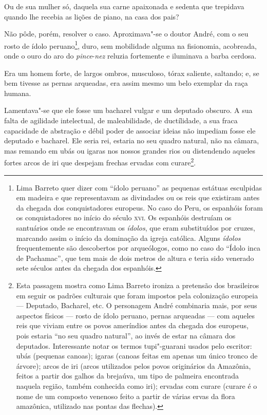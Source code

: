Ou de sua mulher só, daquela sua carne apaixonada e sedenta que
trepidava quando lhe recebia as lições de piano, na casa dos pais?

Não pôde, porém, resolver o caso. Aproximava"-se o doutor André, com o
seu rosto de ídolo peruano\footnote{Lima Barreto quer dizer com ``ídolo
  peruano'' as pequenas estátuas esculpidas em madeira e que
  representavam as divindades ou os reis que existiram antes da chegada
  dos conquistadores europeus. No caso do Peru, os espanhóis foram os
  conquistadores no início do século \textsc{xvi}. Os espanhóis destruíam os
  santuários onde se encontravam os \emph{ídolos}, que eram substituídos
  por cruzes, marcando assim o início da dominação da igreja católica.
  Alguns \emph{ídolos} frequentemente são descobertos por arqueólogos,
  como no caso do ``Ídolo inca de Pachamac'', que tem mais de dois
  metros de altura e teria sido venerado sete séculos antes da chegada
  dos espanhóis.}, duro, sem mobilidade alguma na fisionomia, acobreada,
onde o ouro do aro do \emph{pince}-\emph{nez} reluzia fortemente e
iluminava a barba cerdosa.

Era um homem forte, de largos ombros, musculoso, tórax saliente,
saltando; e, se bem tivesse as pernas arqueadas, era assim mesmo um belo
exemplar da raça humana.

Lamentava"-se que ele fosse um bacharel vulgar e um deputado obscuro. A
sua falta de agilidade intelectual, de maleabilidade, de ductílidade, a
sua fraca capacidade de abstração e débil poder de associar ideias não
impediam fosse ele deputado e bacharel. Ele seria rei,
estaria no seu quadro natural, não
na câmara, mas remando em ubás ou igaras nos nossos grandes rios ou
distendendo aqueles fortes arcos de iri que despejam frechas ervadas com
curare\footnote{Esta passagem mostra como Lima Barreto ironiza a
  pretensão dos brasileiros em seguir os padrões culturais que foram
  impostos pela colonização europeia --- Deputado, Bacharel, etc. O
  personagem André combinaria mais, por seus aspectos físicos --- rosto
  de ídolo peruano, pernas arqueadas --- com aqueles reis que viviam
  entre os povos ameríndios antes da chegada dos europeus, pois estaria
  ``no seu quadro natural'', ao invés de estar na câmara dos deputados.
  Interessante notar os termos tupi"-guarani usados pelo escritor: ubás
  (pequenas canoas); igaras (canoas feitas em apenas um único tronco de
  árvore); arcos de iri (arcos utilizados pelos povos originários da
  Amazônia, feitos a partir dos galhos da brejaúva, um tipo de palmeira
  encontrada naquela região, também conhecida como iri); ervadas com
  curare (curare é o nome de um composto venenoso feito a partir de
  várias ervas da flora amazônica, utilizado nas pontas das flechas).}.

